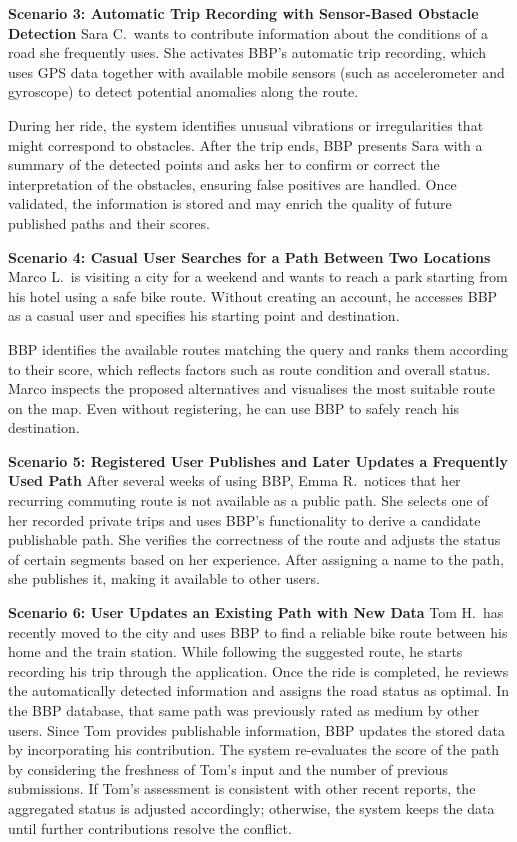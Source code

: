 \par{\textbf{Scenario 3: Automatic Trip Recording with Sensor-Based Obstacle Detection}}
Sara C.\ wants to contribute information about the conditions of a road she frequently uses. She activates BBP’s automatic trip recording, which uses GPS data together with available mobile sensors (such as accelerometer and gyroscope) to detect potential anomalies along the route. 

During her ride, the system identifies unusual vibrations or irregularities that might correspond to obstacles. After the trip ends, BBP presents Sara with a summary of the detected points and asks her to confirm or correct the interpretation of the obstacles, ensuring false positives are handled. Once validated, the information is stored and may enrich the quality of future published paths and their scores.

\par{\textbf{Scenario 4: Casual User Searches for a Path Between Two Locations}}
Marco L.\ is visiting a city for a weekend and wants to reach a park starting from his hotel using a safe bike route. Without creating an account, he accesses BBP as a casual user and specifies his starting point and destination.

BBP identifies the available routes matching the query and ranks them according to their score, which reflects factors such as route condition and overall status.  Marco inspects the proposed alternatives and visualises the most suitable route on the map. Even without registering, he can use BBP to safely reach his destination.

\par{\textbf{Scenario 5: Registered User Publishes and Later Updates a Frequently Used Path}}
After several weeks of using BBP, Emma R.\ notices that her recurring commuting route is not available as a public path. She selects one of her recorded private trips and uses BBP’s functionality to derive a candidate publishable path. She verifies the correctness of the route and adjusts the status of certain segments based on her experience. After assigning a name to the path, she publishes it, making it available to other users.

\par{\textbf{Scenario 6: User Updates an Existing Path with New Data}}
Tom H.\ has recently moved to the city and uses BBP to find a reliable bike route between his home and the train station. While following the suggested route, he starts recording his trip through the application. Once the ride is completed, he reviews the automatically detected information and assigns the road status as optimal. In the BBP database, that same path was previously rated as medium by other users. Since Tom provides publishable information, BBP updates the stored data by incorporating his contribution. The system re-evaluates the score of the path by considering the freshness of Tom's input and the number of previous submissions. If Tom's assessment is consistent with other recent reports, the aggregated status is adjusted accordingly; otherwise, the system keeps the data until further contributions resolve the conflict.

